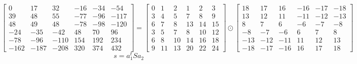 \documentclass{article}%
\begin{document}
\[%
\left[\begin{matrix}0 & 17 & 32 & -16 & -34 & -54\\39 & 48 & 55 & -77 & -96 & -117\\48 & 49 & 48 & -78 & -98 & -120\\-24 & -35 & -42 & 48 & 70 & 96\\-78 & -96 & -110 & 154 & 192 & 234\\-162 & -187 & -208 & 320 & 374 & 432\end{matrix}\right] = \left[\begin{matrix}0 & 1 & 2 & 1 & 2 & 3\\3 & 4 & 5 & 7 & 8 & 9\\6 & 7 & 8 & 13 & 14 & 15\\3 & 5 & 7 & 8 & 10 & 12\\6 & 8 & 10 & 14 & 16 & 18\\9 & 11 & 13 & 20 & 22 & 24\end{matrix}\right] \odot \left[\begin{matrix}18 & 17 & 16 & -16 & -17 & -18\\13 & 12 & 11 & -11 & -12 & -13\\8 & 7 & 6 & -6 & -7 & -8\\-8 & -7 & -6 & 6 & 7 & 8\\-13 & -12 & -11 & 11 & 12 & 13\\-18 & -17 & -16 & 16 & 17 & 18\end{matrix}\right]%
\]%
\[%
s = a_1^t S a_2%
\]%
\end{document}
